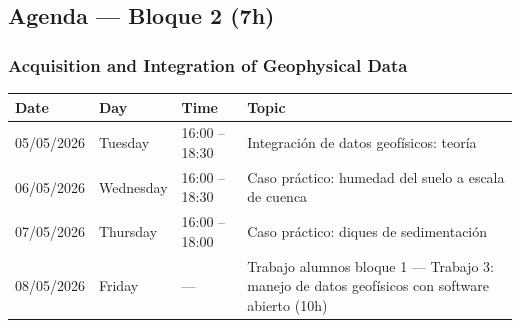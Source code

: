 \subsection{Agenda --- Bloque 2 (7h)}

\subsubsection{Acquisition and Integration of Geophysical Data}

\bigskip\noindent
\begin{tabular}{p{}p{}p{}p{}}
\toprule
Date & Day & Time & Topic \\
\hline
05/05/2026 & Tuesday & 16:00 -- 18:30 & Integración de datos geofísicos: teoría \\
06/05/2026 & Wednesday & 16:00 -- 18:30 & Caso práctico: humedad del suelo a escala de cuenca \\
07/05/2026 & Thursday & 16:00 -- 18:00 & Caso práctico: diques de sedimentación \\
08/05/2026 & Friday & --- & Trabajo alumnos bloque 1 --- Trabajo 3: manejo de datos geofísicos con software abierto (10h) \\
\bottomrule
\end{tabular}

\bigskip
